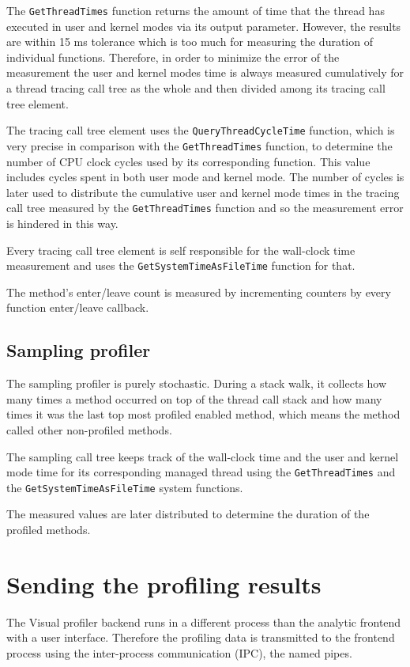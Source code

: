 The \texttt{GetThreadTimes} function returns the amount of time that the thread has executed in user and kernel modes via its output parameter. However, the results are within 15 ms tolerance which is too much for measuring the duration of individual functions. Therefore, in order to minimize the error of the measurement the user and kernel modes time is always measured cumulatively for a thread tracing call tree as the whole and then divided among its tracing call tree element. 

The tracing call tree element uses the \texttt{QueryThreadCycleTime} function, which is very precise in comparison with the \texttt{GetThreadTimes} function, to determine the number of CPU clock cycles used by its corresponding function. This value includes cycles spent in both user mode and kernel mode. The number of cycles is later used to distribute the cumulative user and kernel mode times in the tracing call tree measured by the \texttt{GetThreadTimes} function and so the measurement error is hindered in this way.

Every tracing call tree element is self responsible for the wall-clock time measurement and uses the \texttt{GetSystemTimeAsFileTime} function for that.

The method's enter/leave count is measured by incrementing counters by every function enter/leave callback.

\subsection{Sampling profiler}
The sampling profiler is purely stochastic. During a stack walk, it collects how many times a method occurred on top of the thread call stack and how many times it was the last top most profiled enabled method, which means the method called other non-profiled methods.

The sampling call tree keeps track of the wall-clock time and the user and kernel mode time for its corresponding managed thread using the \texttt{GetThreadTimes} and the \texttt{GetSystemTimeAsFileTime} system functions.

The measured values are later distributed to determine the duration of the profiled methods.

\section{Sending the profiling results}
The Visual profiler backend runs in a different process than the analytic frontend with a user interface. Therefore the profiling data is transmitted to the frontend process using the inter-process communication (IPC), the named pipes. 

